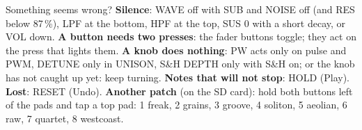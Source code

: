 \documentclass{article}
\begin{document}
\begin{minipage}[t]{128mm}
\begin{card}{Something seems wrong?}
\fontsize{7.3}{8.9}\selectfont
\textbf{Silence}: WAVE off with SUB and NOISE off (and RES below 87\,\%), LPF at the bottom, HPF at
the top, SUS 0 with a short decay, or VOL down.\quad
\textbf{A button needs two presses}: the fader buttons toggle; they act on the press that lights them.\quad
\textbf{A knob does nothing}: PW acts only on pulse and PWM, DETUNE only in UNISON, S\&H DEPTH only
with S\&H on; or the knob has not caught up yet: keep turning.\quad
\textbf{Notes that will not stop}: HOLD (Play).\quad
\textbf{Lost}: RESET (Undo).\quad
\textbf{Another patch} (on the SD card): hold both buttons left of the pads and tap a top pad: 1 freak,
2 grains, 3 groove, 4 soliton, 5 aeolian, 6 raw, 7 quartet, 8 westcoast.
\end{card}
\end{minipage}
\end{document}
